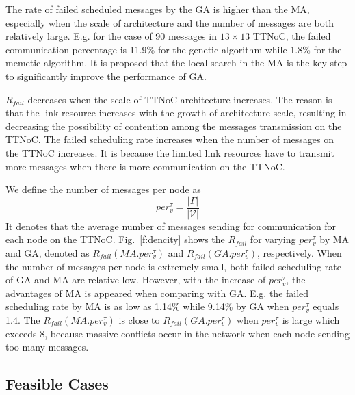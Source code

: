 \documentclass[10pt,journal]{IEEEtran}
\newcommand{\calV}{\mathcal{V}}
\theoremstyle{remark}
\begin{document}
The rate of failed scheduled messages by the GA is higher than the MA, especially when the scale of architecture and the number of messages are both relatively large.
E.g. for the case of 90 messages in $13\times 13$ TTNoC,
 the failed communication percentage is 11.9\% for the genetic algorithm while 1.8\% for the memetic algorithm.
It is proposed that the local search in the MA is the key step to significantly improve the performance of GA.

$R_{fail}$ decreases when the scale of TTNoC architecture increases. 
The reason is that the link resource increases with the growth of architecture scale,
 resulting in decreasing the possibility of contention among the messages transmission on the TTNoC.
The failed scheduling rate increases when the number of messages on the TTNoC increases.
It is because the limited link resources have to transmit more messages when there is more communication on the TTNoC.

We define the number of messages per node as
\begin{equation*}
per^\tau_v = \frac{|\Gamma|}{|\calV|}
\end{equation*}
It denotes that the average number of messages sending for communication for each node on the TTNoC.
Fig.~\ref{f:dencity} shows the $R_{fail}$ for varying $per^\tau_v$ by MA and GA, denoted as $R_{fail}({MA.per^\tau_v})$ and $R_{fail}(GA.per^\tau_v)$, respectively. 
When the number of messages per node is extremely small, both failed scheduling rate of GA and MA are relative low.
However, with the increase of $per^\tau_v$, the advantages of MA is appeared when comparing with GA.
E.g. the failed scheduling rate by MA is as low as 1.14\% while 9.14\% by GA when $per^\tau_v$ equals 1.4.
The $R_{fail}({MA.per^\tau_v})$ is close to $R_{fail}({GA.per^\tau_v})$ when $per^\tau_v$ is large which exceeds 8, 
 because massive conflicts occur in the network when each node sending too many messages.

\subsection{Feasible Cases}
\end{document}
